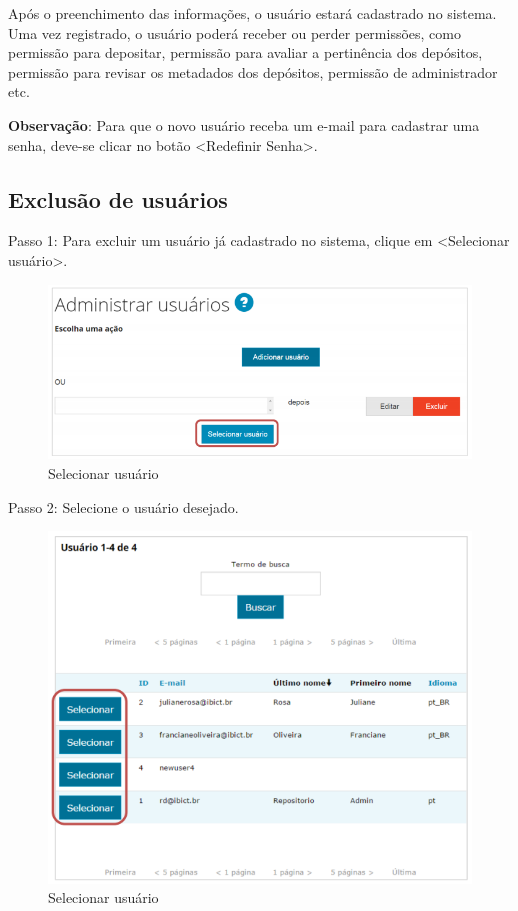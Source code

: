 \documentclass[12pt,hidelinks]{article}
\begin{document}
    Após o preenchimento das informações, o usuário estará cadastrado no sistema. Uma vez registrado, o usuário poderá receber ou perder permissões, como permissão para depositar, permissão para avaliar a pertinência dos depósitos, permissão para revisar os metadados dos depósitos, permissão de administrador etc.
    
    \singlespacing
    
    \textbf{Observação}: Para que o novo usuário receba um e-mail para cadastrar uma senha, deve-se clicar no botão <Redefinir Senha>.

    \subsection{Exclusão de usuários}
    
    Passo 1: Para excluir um usuário já cadastrado no sistema, clique em <Selecionar usuário>.
    
    \begin{figure}[!htp]
                \centering
                \includegraphics[scale=0.8]{figura/Figura55.png}
                \caption{Selecionar usuário}
            \label{Rotulo}
        \end{figure}
    
\newpage

    Passo 2: Selecione o usuário desejado.
    
    \begin{figure}[!htp]
                \centering
                \includegraphics[scale=0.8]{figura/Figura56.png}
                \caption{Selecionar usuário}
            \label{Rotulo}
        \end{figure}
\end{document}
